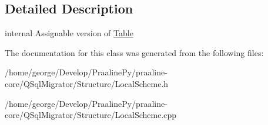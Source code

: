 \subsection{Detailed Description}
internal Assignable version of \hyperlink{class_q_sql_migrator_1_1_structure_1_1_local_scheme_1_1_table}{Table} 

The documentation for this class was generated from the following files\+:\begin{DoxyCompactItemize}
\item 
/home/george/\+Develop/\+Praaline\+Py/praaline-\/core/\+Q\+Sql\+Migrator/\+Structure/Local\+Scheme.\+h\item 
/home/george/\+Develop/\+Praaline\+Py/praaline-\/core/\+Q\+Sql\+Migrator/\+Structure/Local\+Scheme.\+cpp\end{DoxyCompactItemize}

